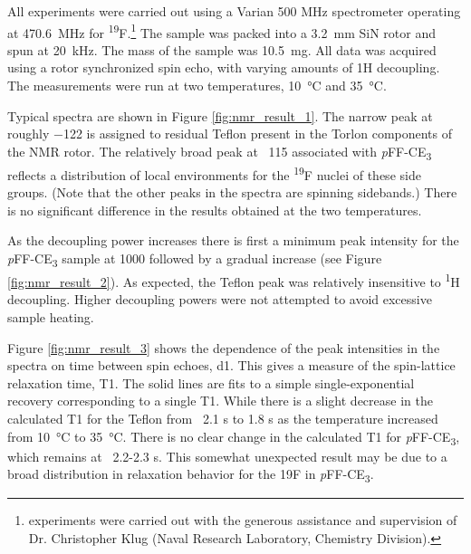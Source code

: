 All experiments were carried out using a Varian 500 MHz spectrometer operating
at \SI{470.6}{\mega\hertz} for \textsuperscript{19}F.\footnote{
experiments were carried out with the generous assistance and supervision of Dr.
Christopher Klug (Naval Research Laboratory, Chemistry Division).}
The sample was packed into a \SI{3.2}{\mm} SiN rotor and spun at
\SI{20}{\kilo\hertz}.  The mass of the sample was \SI{10.5}{\mg}.  All data was
acquired using a rotor synchronized spin echo, with varying amounts of 1H
decoupling. The measurements were run at two temperatures, \SI{10}{\celsius} and
\SI{35}{\celsius}.

Typical spectra are shown in Figure \ref{fig:nmr_result_1}.  The narrow peak at
roughly \SI{-122}{\ppm} is assigned to residual Teflon present in the Torlon
components of the NMR rotor.  The relatively broad peak at ~\SI{115}{\ppm}
associated with \emph{p}FF-CE\textsubscript{3} reflects a distribution of local
environments for the \textsuperscript{19}F nuclei of these side groups.  (Note
that the other peaks in the spectra are spinning sidebands.) There is no
significant difference in the results obtained at the two temperatures.

As the decoupling power increases there is first a minimum peak intensity for
the \emph{p}FF-CE\textsubscript{3} sample at 1000 followed by a gradual
increase (see Figure \ref{fig:nmr_result_2}).  As expected, the Teflon peak was
relatively insensitive to \textsuperscript{1}H decoupling.  Higher decoupling
powers were not attempted to avoid excessive sample heating.

Figure \ref{fig:nmr_result_3} shows the dependence of the peak intensities in
the  spectra on time between spin echoes, d1.  This gives a measure
of the spin-lattice relaxation time, T1.  The solid lines are fits to a simple
single-exponential recovery corresponding to a single T1.  While there is a
slight decrease in the calculated T1 for the Teflon from ~2.1 s to 1.8 s as the
temperature increased from \SI{10}{\celsius} to \SI{35}{\celsius}.  There is no
clear change in the calculated T1 for \emph{p}FF-CE\textsubscript{3}, which
remains at ~2.2-2.3 s.  This somewhat unexpected result may be due to a broad
distribution in relaxation behavior for the 19F in
\emph{p}FF-CE\textsubscript{3}.

